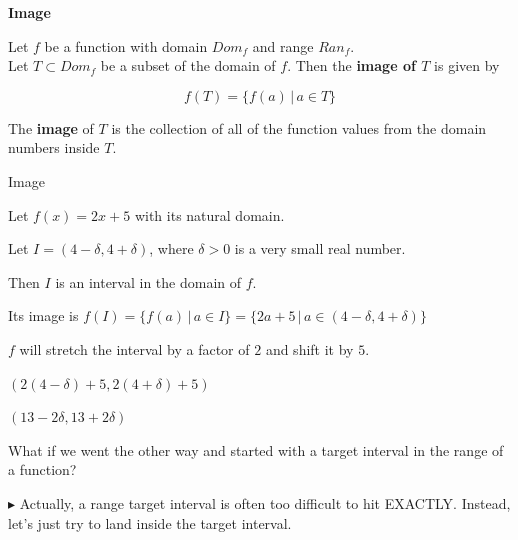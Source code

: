 \documentclass{ximera}
\begin{document}
\begin{definition} \textbf{\textcolor{green!50!black}{Image}}

Let $f$ be a function with domain $Dom_f$ and range $Ran_f$. \\
Let $T \subset Dom_f$ be a subset of the domain of $f$.  Then the \textbf{image of $T$} is given by

\[       f(T) = \{   f(a)  \, | \, a \in T            \}             \]


The \textbf{image} of $T$ is the collection of all of the function values from the domain numbers inside $T$.


\end{definition}














\begin{example} Image

Let $f(x) = 2x + 5$ with its natural domain.

Let  $I = (4-\delta, 4+\delta)$, where $\delta > 0$ is a very small real number.

Then $I$ is an interval in the domain of $f$.


Its image is $f(I) = \{   f(a)  \, | \, a \in I \}  = \{   2a+5  \, | \, a \in (4-\delta, 4+\delta) \}$  



$f$ will stretch the interval by a factor of $2$ and shift it by $5$.


$(2(4-\delta)+5, 2(4+\delta)+5)$


$(13-2\delta, 13+2\delta)$






\end{example}













What if we went the other way and started with a target interval in the range of a function? 

\textbf{\textcolor{red!70!darkgray}{$\blacktriangleright$}} Actually, a range target interval is often too difficult to hit EXACTLY.  Instead, let's just try to land inside the target interval. 
\end{document}
